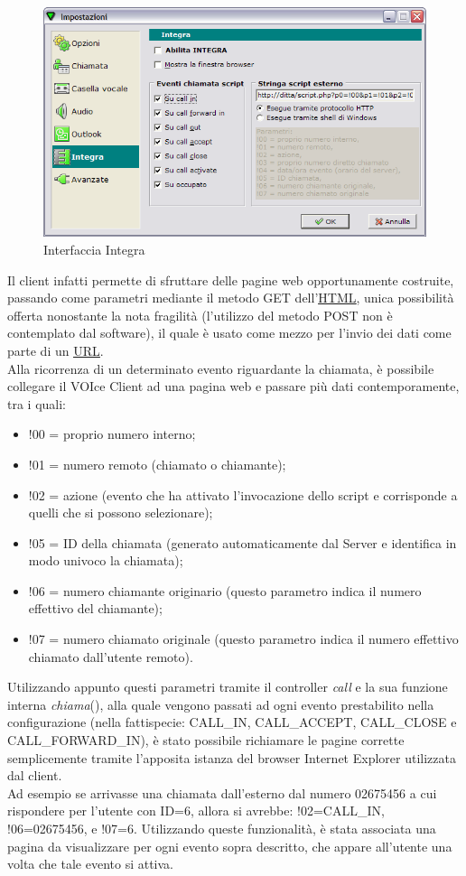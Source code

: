 \begin{figure}[!ht]
\centering
  \includegraphics[scale=0.6]{./images/voispeedoptions.png}
\caption{Interfaccia Integra}
\label{integra}
\end{figure}

\noindent
Il client infatti permette di sfruttare delle pagine web opportunamente costruite, passando come parametri mediante il metodo GET dell'\hyperlink{html}{\underline{HTML}}, unica possibilit\`a offerta nonostante la nota fragilit\`a (l'utilizzo del metodo POST non \`e contemplato dal software), il quale \`e usato come mezzo per l'invio dei dati come parte di un \hyperlink{url}{\underline{URL}}. \\
Alla ricorrenza di un determinato evento riguardante la chiamata, \`e possibile collegare il VOIce Client ad una pagina web e passare pi\`u dati contemporamente, tra i quali: 
\begin{itemize}
 \item !00 = proprio numero interno;
 \item !01 = numero remoto (chiamato o chiamante);
 \item !02 = azione (evento che ha attivato l'invocazione dello script e corrisponde a quelli che si possono selezionare);
 \item !05 = ID della chiamata (generato automaticamente dal Server e identifica in modo univoco la chiamata);
 \item !06 = numero chiamante originario (questo parametro indica il numero effettivo del chiamante);
 \item !07 = numero chiamato originale (questo parametro indica il numero effettivo chiamato dall'utente remoto).
\end{itemize}
\noindent
Utilizzando appunto questi parametri tramite il controller \textit{call} e la sua funzione interna \textit{chiama}(), alla quale vengono passati ad ogni evento prestabilito nella configurazione (nella fattispecie: CALL\_IN, CALL\_ACCEPT, CALL\_CLOSE e CALL\_FORWARD\_IN), \`e stato possibile richiamare le pagine corrette semplicemente tramite l'apposita istanza del browser Internet Explorer utilizzata dal client. \\
Ad esempio se arrivasse una chiamata dall'esterno dal numero 02675456 a cui rispondere per l'utente con ID=6, allora si avrebbe: !02=CALL\_IN, !06=02675456, e !07=6. Utilizzando queste funzionalit\`a, \`e stata associata una pagina da visualizzare per ogni evento sopra descritto, che appare all'utente una volta che tale evento si attiva. 

